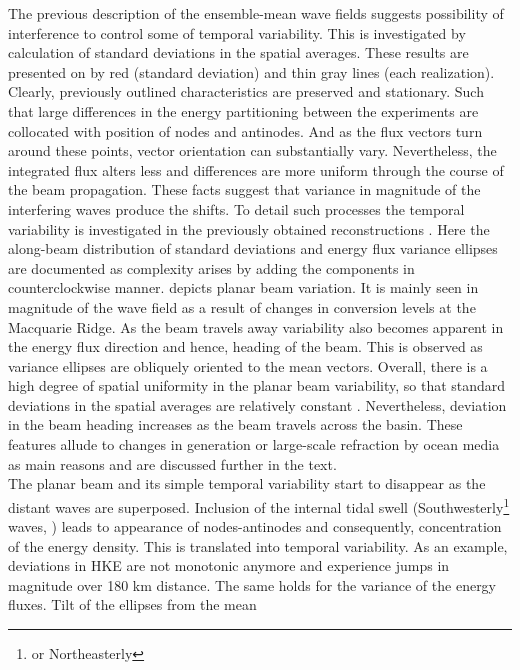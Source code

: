 \documentclass[12pt]{article}
\begin{document}
The previous description of the ensemble-mean wave fields suggests possibility of interference to 
control some of temporal variability. This is investigated by calculation of standard deviations in 
the spatial averages. These results are presented on 
 by red (standard deviation) and thin gray lines (each realization). 
Clearly, previously outlined characteristics are preserved and stationary. Such that large 
differences in the energy partitioning between the experiments are collocated with position of 
nodes and antinodes. And as the flux vectors turn around these points, vector orientation can 
substantially vary. Nevertheless, the integrated flux alters less and differences are more uniform 
through the course of the beam propagation. These facts suggest that variance in magnitude of the 
interfering waves produce the shifts. To detail such processes the temporal variability is 
investigated in the previously obtained reconstructions . Here the 
along-beam distribution of standard deviations and energy flux variance ellipses are documented as 
complexity arises by adding the components in counterclockwise manner. 
 depicts planar beam variation. It is mainly seen in magnitude 
of the wave field as a result of changes in conversion levels at the Macquarie Ridge. As the beam 
travels away variability also becomes apparent in the energy flux direction and hence, heading of 
the beam. This is observed as variance ellipses are obliquely oriented to the mean vectors. 
Overall, there is a high degree of spatial uniformity in the planar beam variability, so that 
standard deviations in the spatial averages are relatively constant 
. Nevertheless, deviation in the beam heading increases as 
the beam travels across the basin. These features allude to changes in generation or large-scale 
refraction by ocean media as main reasons and are discussed further in the text.\\
The planar beam and its simple temporal variability start to disappear as the distant waves are 
superposed. Inclusion of the internal tidal swell (Southwesterly\footnote{ or Northeasterly} 
waves, ) leads to appearance of nodes-antinodes and consequently,  
concentration of the energy density. This is translated into temporal variability. As an example, 
deviations in HKE are not monotonic anymore and experience jumps in magnitude over 180 km distance. 
The same holds for the variance of the energy fluxes. Tilt of the ellipses from the mean 
\end{document}
